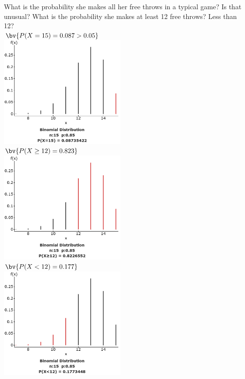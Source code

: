 \documentclass{article}
\begin{document}
\begin{flushleft}
\begin{enumalpha}
\newpage
\item What is the probability she makes all her free throws in a typical game? Is that unusual? What is the probability she makes at least 12 free throws? Less than 12?\\
\medskip
$\bv{P(X=15) = 0.087 >0.05}$\\ 
\smallskip
\includegraphics[width=2.5in]{images/group06_Q1_c_1}\\
\bigskip
$\bv{P(X \ge 12) = 0.823}$\\
\smallskip
\includegraphics[width=2.5in]{images/group06_Q1_c_2}\\
\bigskip
$\bv{P(X < 12) = 0.177}$\\
\smallskip
\includegraphics[width=2.5in]{images/group06_Q1_c_3}\\

\vspace{0.5in}


\end{enumalpha}
\end{flushleft}
\end{document}
